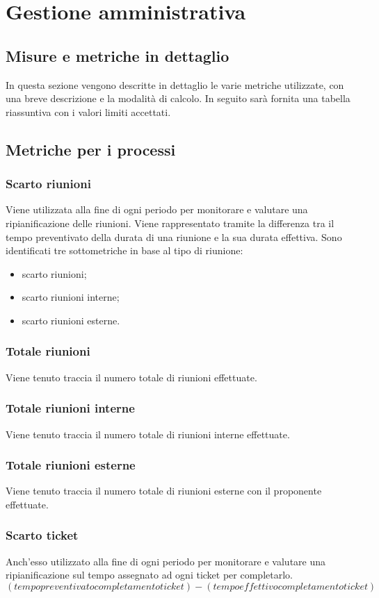\section{Gestione amministrativa}
\subsection{Misure e metriche in dettaglio}
In questa sezione vengono descritte in dettaglio le varie metriche utilizzate, con una breve descrizione e la modalità di calcolo. In seguito sarà fornita una tabella riassuntiva con i valori limiti accettati.
\subsection{Metriche per i processi}
\subsubsection{Scarto riunioni}
Viene utilizzata alla fine di ogni periodo per monitorare e valutare una ripianificazione delle riunioni. Viene rappresentato tramite la differenza tra il tempo preventivato della durata di una riunione e la sua durata effettiva. Sono identificati tre sottometriche in base al tipo di riunione:
\begin{itemize}
    \item scarto riunioni;
    \item scarto riunioni interne;
    \item scarto riunioni esterne.
\end{itemize}

\subsubsection{Totale riunioni}
Viene tenuto traccia il numero totale di riunioni effettuate.
\subsubsection{Totale riunioni interne}
Viene tenuto traccia il numero totale di riunioni interne effettuate.
\subsubsection{Totale riunioni esterne}
Viene tenuto traccia il numero totale di riunioni esterne con il proponente effettuate.

\subsubsection{Scarto ticket}
Anch'esso utilizzato alla fine di ogni periodo per monitorare e valutare una ripianificazione sul tempo assegnato ad ogni ticket per completarlo. 
\[
    (tempo preventivato completamento ticket)-(tempo effettivo completamento ticket)
\]

